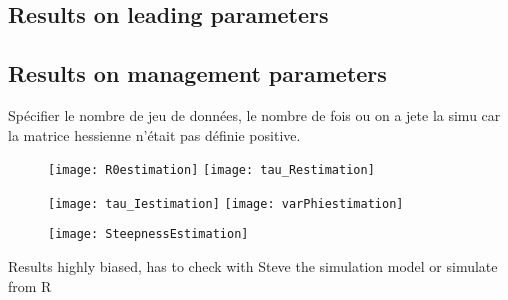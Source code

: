 \subsection{Results on leading parameters}
\subsection{Results on management parameters}
Spécifier le nombre de jeu de données,  le nombre de fois ou on a jete
la simu car la matrice hessienne n'était pas définie positive.

\begin{figure}
  \texttt{[image: R0estimation]}
  \texttt{[image: tau\_Restimation]}
\end{figure} 

\begin{figure}
  \texttt{[image: tau\_Iestimation]}
  \texttt{[image: varPhiestimation]}
\end{figure} 

\begin{figure}
  \texttt{[image: SteepnessEstimation]}
\end{figure}



Results highly biased, has to check with Steve the simulation model or simulate from R 

